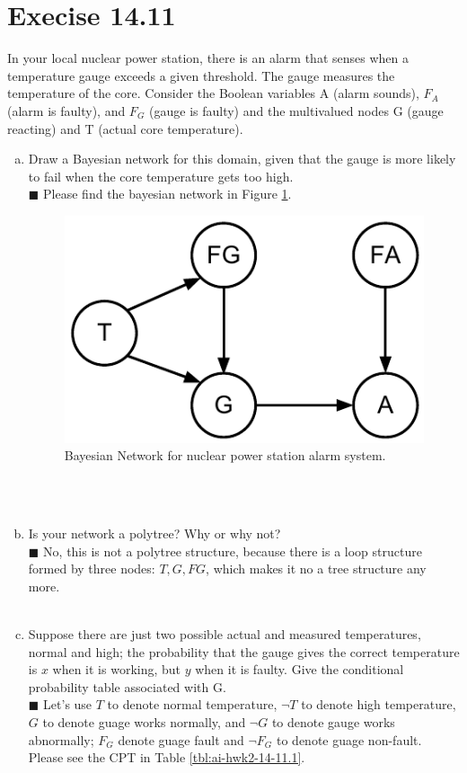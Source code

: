 \documentclass{article}
\newcommand{\solution}[1]{~\\ $\blacksquare$ \sffamily\upshape\selectfont #1
\normalfont ~\\~ }
\begin{document}
\section{Execise 14.11}
In your local nuclear power station, there is an alarm that senses
when a temperature gauge exceeds a given threshold. The gauge measures
the temperature of the core. Consider the Boolean variables A (alarm
sounds), $F_A$ (alarm is faulty), and $F_G$ (gauge is faulty) and the
multivalued nodes G (gauge reacting) and T (actual core temperature).
\begin{enumerate}[a.]
\item Draw a Bayesian network for this domain, given that the gauge is
  more likely to fail when the core temperature gets too high.
\solution{
  Please find the bayesian network in Figure \ref{fig:3}. 
  \begin{figure}[ht]
    \centering
    \includegraphics[width=.7\textwidth]{AI-HWK-2_14_11.pdf}
    \caption{Bayesian Network for nuclear power station alarm system.} 
    \label{fig:3}
  \end{figure}
}
\item Is your network a polytree? Why or why not?
\solution{No, this is not a polytree structure, because there is a loop
structure formed by three nodes: $T, G, FG$, which makes it no a tree
structure any more. }
\item Suppose there are just two possible actual and measured
  temperatures, normal and high; the probability that the gauge gives
  the correct temperature is $x$ when it is working, but $y$ when it is
  faulty. Give the conditional probability table associated with G.
  \solution{Let's use $T$ to denote normal temperature, $\neg T$ to
    denote high temperature, $G$ to denote guage works normally, and
    $\neg G$ to denote gauge works abnormally; $F_G$ denote guage
    fault and $\neg F_G$ to denote guage non-fault. 
    Please see the CPT in Table \ref{tbl:ai-hwk2-14-11.1}.
}
\end{enumerate}
\end{document}
